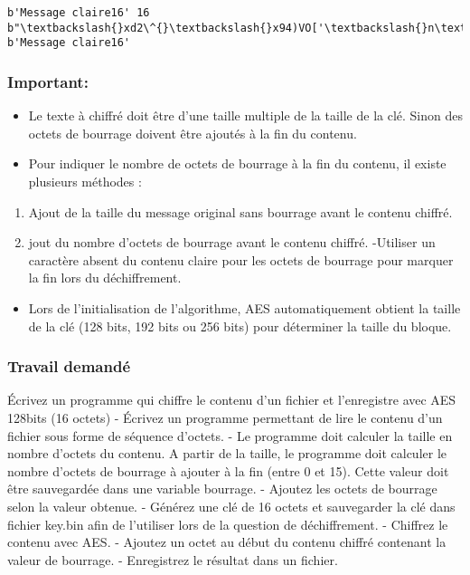 \documentclass[11pt]{article}
\providecommand{\tightlist}{%
      \setlength{\itemsep}{0pt}\setlength{\parskip}{0pt}}
\begin{document}
    \begin{Verbatim}[commandchars=\\\{\}]
b'Message claire16' 16
b"\textbackslash{}xd2\^{}\textbackslash{}x94)VO['\textbackslash{}n\textbackslash{}xf3\textbackslash{}\textbackslash{}\textbackslash{}xed\textbackslash{}xef\textbackslash{}xeb5\textbackslash{}x03"
b'Message claire16'
    \end{Verbatim}

    \hypertarget{important}{%
\subsubsection{Important:}\label{important}}

\begin{itemize}
\tightlist
\item
  Le texte à chiffré doit être d'une taille multiple de la taille de la
  clé. Sinon des octets de bourrage doivent être ajoutés à la fin du
  contenu.
\item
  Pour indiquer le nombre de octets de bourrage à la fin du contenu, il
  existe plusieurs méthodes :
\end{itemize}

\begin{enumerate}
\def\labelenumi{\arabic{enumi}.}
\tightlist
\item
  Ajout de la taille du message original sans bourrage avant le contenu
  chiffré.
\item
  jout du nombre d'octets de bourrage avant le contenu chiffré.
  -Utiliser un caractère absent du contenu claire pour les octets de
  bourrage pour marquer la fin lors du déchiffrement.
\end{enumerate}

\begin{itemize}
\tightlist
\item
  Lors de l'initialisation de l'algorithme, AES automatiquement obtient
  la taille de la clé (128 bits, 192 bits ou 256 bits) pour déterminer
  la taille du bloque.
\end{itemize}

\hypertarget{travail-demanduxe9}{%
\subsubsection{Travail demandé}\label{travail-demanduxe9}}

Écrivez un programme qui chiffre le contenu d'un fichier et l'enregistre
avec AES 128bits (16 octets) - Écrivez un programme permettant de lire
le contenu d'un fichier sous forme de séquence d'octets. - Le programme
doit calculer la taille en nombre d'octets du contenu. A partir de la
taille, le programme doit calculer le nombre d'octets de bourrage à
ajouter à la fin (entre 0 et 15). Cette valeur doit être sauvegardée
dans une variable bourrage. - Ajoutez les octets de bourrage selon la
valeur obtenue. - Générez une clé de 16 octets et sauvegarder la clé
dans fichier key.bin afin de l'utiliser lors de la question de
déchiffrement. - Chiffrez le contenu avec AES. - Ajoutez un octet au
début du contenu chiffré contenant la valeur de bourrage. - Enregistrez
le résultat dans un fichier.
\end{document}
